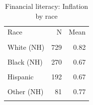 \begin{table}[htbp]\centering\small
\caption{Financial literacy: Inflation by race}
\label{tab:finlit_q2_by_race_eth}
\begin{tabular}{lrr}\toprule
Race & N & Mean \\\\ \midrule
White (NH) & 729 & 0.82 \\\\
Black (NH) & 270 & 0.67 \\\\
Hispanic & 192 & 0.67 \\\\
Other (NH) & 81 & 0.77 \\\\
\bottomrule
\end{tabular}\end{table}
